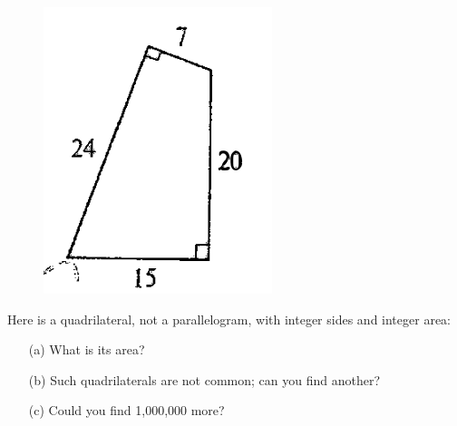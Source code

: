 \documentclass[11pt]{article}
\begin{document}
\begin{figure}
  \includegraphics[width=0.65\linewidth]{quad.png}
\end{figure}


 Here is a quadrilateral, not a parallelogram, with integer sides and integer area:
\begin{itemize}
  \item [(a)] What is its area?
  \item [(b)] Such quadrilaterals are not common; can you find another?
  \item [(c)] Could you find 1,000,000 more?
\end{itemize}
\end{document}
